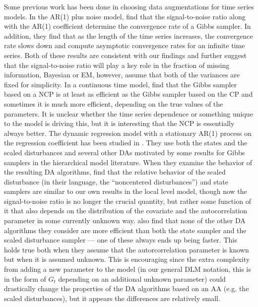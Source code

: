 \documentclass{article}
\begin{document}
Some previous work has been done in choosing data augmentations for time series models. In the AR(1) plus noise model, \citet{pitt1999analytic} find that the signal-to-noise ratio along with the AR(1) coefficient determine the convergence rate of a Gibbs sampler. In addition, they find that as the length of the time series increases, the convergence rate slows down and compute asymptotic convergence rates for an infinite time series. Both of these results are consistent with our findings and further suggest that the signal-to-noise ratio will play a key role in the fraction of missing information, Bayesian or EM, however, \citet{pitt1999analytic} assume that both of the variances are fixed for simplicity. In a continuous time model, \citet{roberts2004bayesian} find that the Gibbs sampler based on a NCP is at least as efficient as the Gibbs sampler based on the CP and sometimes it is much more efficient, depending on the true values of the parameters. It is unclear whether the time series dependence or something unique to the model is driving this, but it is interesting that the NCP is essentially always better. The dynamic regression model with a stationary AR(1) process on the regression coefficient has been studied in \citet{fruhwirth2004efficient}. They use both the states and the scaled disturbances and several other DAs motivated by some results for Gibbs samplers in the hierarchical model literature. When they examine the behavior of the resulting DA algorithms, \citet{fruhwirth2004efficient} find that the relative behavior of the scaled disturbance (in their language, the ``noncentered disturbances'') and state samplers are similar to our own results in the local level model, though now the signal-to-noise ratio is no longer the crucial quantity, but rather some function of it that also depends on the distribution of the covariate and the autocorrelation parameter in some currently unknown way. \citet{fruhwirth2004efficient} also find that none of the other DA algorithms they consider are more efficient than both the state sampler and the scaled disturbance sampler --- one of these always ends up being faster. This holds true both when they assume that the autorcorrelation parameter is known but when it is assumed unknown. This is encouraging since the extra complexity from adding a new parameter to the model (in our general DLM notation, this is in the form of $G_t$ depending on an additional unknown parameter) could drastically change the properties of the DA algorithms based on an AA (e.g. the scaled disturbances), but it appears the differences are relatively small.
\end{document}
